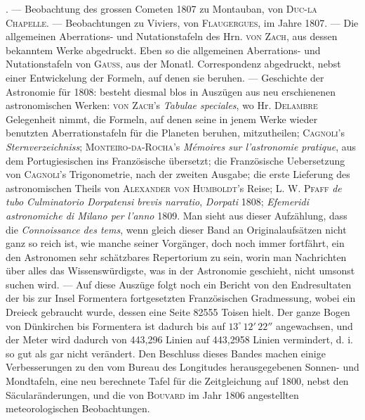 . — Beobachtung des grossen Cometen 1807 zu Montauban, von \textsc{Duc-la Chapelle}. — Beobachtungen zu Viviers, von \textsc{Flaugergues}, im Jahre 1807. — Die allgemeinen Aberrations- und Nutationstafeln des Hrn. \textsc{von Zach}, aus dessen bekanntem Werke abgedruckt. Eben so die allgemeinen Aberrations- und Nutationstafeln von \textsc{Gauss}, aus der Monatl. Correspondenz abgedruckt, nebst einer Entwickelung der Formeln, auf denen sie beruhen. — Geschichte der Astronomie für 1808: besteht diesmal blos in Auszügen aus neu erschienenen astronomischen Werken: \textsc{von Zach}'s \emph{Tabulae speciales}, wo Hr. \textsc{Delambre} Gelegenheit nimmt, die Formeln, auf denen seine in jenem Werke wieder benutzten Aberrationstafeln für die Planeten beruhen, mitzutheilen; \textsc{Cagnoli}'s \emph{Sternverzeichniss}; \textsc{Monteiro-da-Rocha}'s \emph{Mémoires sur l'astronomie pratique}, aus dem Portugiesischen ins Französische übersetzt; die Französische Uebersetzung von \textsc{Cagnoli}'s Trigonometrie, nach der zweiten Ausgabe; die erste Lieferung des astronomischen Theils von \textsc{Alexander von Humboldt}'s Reise; \textsc{L. W. Pfaff} \emph{de tubo Culminatorio Dorpatensi brevis narratio}, \emph{Dorpati} 1808; \emph{Efemeridi astronomiche di Milano per l'anno} 1809. Man sieht aus dieser Aufzählung, dass die \emph{Connoissance des tems}, wenn gleich dieser Band an Originalaufsätzen nicht ganz so reich ist, wie manche seiner Vorgänger, doch noch immer fortfährt, ein den Astronomen sehr schätzbares Repertorium zu sein, worin man Nachrichten über alles das Wissenswürdigste, was in der Astronomie geschieht, nicht umsonst suchen wird. — Auf diese Auszüge folgt noch ein Bericht von den Endresultaten der bis zur Insel Formentera fortgesetzten Französischen Gradmessung, wobei ein Dreieck gebraucht wurde, dessen eine Seite 82555 Toisen hielt. Der ganze Bogen von Dünkirchen bis Formentera ist dadurch bis auf $13^\circ\,12'\,22''$ angewachsen, und der Meter wird dadurch von 443,296 Linien auf 443,2958 Linien vermindert, d. i. so gut als gar nicht verändert. Den Beschluss dieses Bandes machen einige Verbesserungen zu den vom Bureau des Longitudes herausgegebenen Sonnen- und Mondtafeln, eine neu berechnete Tafel für die Zeitgleichung auf 1800, nebst den Säcularänderungen, und die von \textsc{Bouvard} im Jahr 1806 angestellten meteorologischen Beobachtungen.
